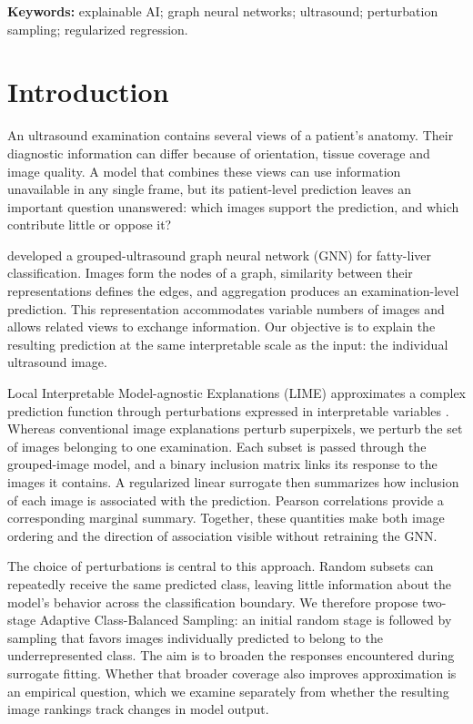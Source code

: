 
\noindent\textbf{Keywords:} explainable AI; graph neural networks; ultrasound; perturbation sampling; regularized regression.

\section{Introduction}
An ultrasound examination contains several views of a patient's anatomy. Their diagnostic information can differ because of orientation, tissue coverage and image quality. A model that combines these views can use information unavailable in any single frame, but its patient-level prediction leaves an important question unanswered: which images support the prediction, and which contribute little or oppose it?

\citet{yen2024fattyliver} developed a grouped-ultrasound graph neural network (GNN) for fatty-liver classification. Images form the nodes of a graph, similarity between their representations defines the edges, and aggregation produces an examination-level prediction. This representation accommodates variable numbers of images and allows related views to exchange information. Our objective is to explain the resulting prediction at the same interpretable scale as the input: the individual ultrasound image.

Local Interpretable Model-agnostic Explanations (LIME) approximates a complex prediction function through perturbations expressed in interpretable variables \citep{ribeiro2016lime}. Whereas conventional image explanations perturb superpixels, we perturb the set of images belonging to one examination. Each subset is passed through the grouped-image model, and a binary inclusion matrix links its response to the images it contains. A regularized linear surrogate then summarizes how inclusion of each image is associated with the prediction. Pearson correlations provide a corresponding marginal summary. Together, these quantities make both image ordering and the direction of association visible without retraining the GNN.

The choice of perturbations is central to this approach. Random subsets can repeatedly receive the same predicted class, leaving little information about the model's behavior across the classification boundary. We therefore propose two-stage Adaptive Class-Balanced Sampling: an initial random stage is followed by sampling that favors images individually predicted to belong to the underrepresented class. The aim is to broaden the responses encountered during surrogate fitting. Whether that broader coverage also improves approximation is an empirical question, which we examine separately from whether the resulting image rankings track changes in model output.

